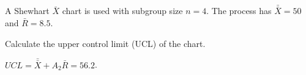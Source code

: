 
\begin{question}
A Shewhart \(\bar X\) chart is used with subgroup size \(n=4\). The process has \(\bar{\bar X}=50\) and \(\bar R=8.5\).

Calculate the upper control limit (UCL) of the chart.
\end{question}

\begin{solution}
\(UCL=\bar{\bar X}+A_2\bar R=56.2\).
\end{solution}

